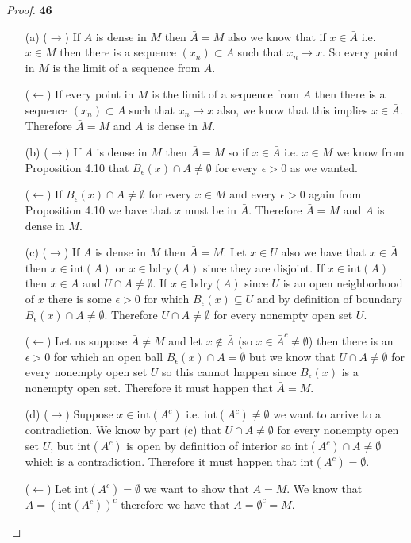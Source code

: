 \documentclass[11pt]{article}
\newcommand{\bdry}{\text{bdry}}
\newcommand{\inter}{\text{int}}
\theoremstyle{definition}
\begin{document}
\cleardoublepage
    \begin{proof}{\textbf{46}}
    \begin{itemize}
    \item [(a)] ($\rightarrow$)
    If $A$ is dense in $M$ then $\bar{A} = M$ also we know that if $x \in \bar{A}$
    i.e. $x \in M$ then there is a sequence $(x_n) \subset A$ such that
    $x_n \to x$. So every point in $M$ is the limit of a sequence from $A$.
    
    ($\leftarrow$) If every point in $M$ is the limit of a sequence from $A$
    then there is a sequence $(x_n) \subset A$ such that $x_n \to x$ also, we
    know that this implies $x \in \bar{A}$. Therefore $\bar{A} = M$ and $A$ is
    dense in $M$.

    \item [(b)] ($\rightarrow$) If $A$ is dense in $M$ then $\bar{A} = M$ so
    if $x \in \bar{A}$ i.e. $x \in M$ we know from Proposition 4.10 that
    $B_{\epsilon}(x) \cap A \neq \emptyset$ for every $\epsilon > 0$ as we
    wanted.

    ($\leftarrow$) If $B_{\epsilon}(x) \cap A \neq \emptyset$ for every $x \in M$
    and every $\epsilon > 0$ again from Proposition 4.10 we have that $x$ must
    be in $\bar{A}$. Therefore $\bar{A} = M$ and $A$ is dense in $M$.

    \item [(c)] ($\rightarrow$) If $A$ is dense in $M$ then $\bar{A} = M$. Let
    $x \in U$ also we have that  $x \in \bar{A}$ then $x \in \inter(A)$ or
    $x \in \bdry(A)$ since they are disjoint. If $x \in \inter(A)$ then $x \in A$
    and $U \cap A \neq \emptyset$.
    If $x \in \bdry(A)$ since $U$ is an open neighborhood of $x$ there is some
    $\epsilon > 0$ for which $B_{\epsilon}(x) \subseteq U$ and by definition
    of boundary $B_{\epsilon}(x) \cap A \neq \emptyset$. Therefore
    $U \cap A \neq \emptyset$ for every nonempty open set $U$.

    ($\leftarrow$) Let us suppose $\bar{A} \neq M$ and let $x \not\in \bar{A}$
    (so $x \in \bar{A}^c \neq \emptyset$)
    then there is an $\epsilon >0$ for which an open ball 
    $B_{\epsilon}(x) \cap  A = \emptyset$ but
    we know that $U \cap A \neq \emptyset$ for every nonempty open set $U$
    so this cannot happen since
    $B_{\epsilon}(x)$ is a nonempty open set. Therefore it must happen that
    $\bar{A} = M$.

    \item [(d)] ($\rightarrow$) Suppose $x \in \inter(A^c)$ i.e.
    $\inter(A^c) \neq \emptyset$ we want to arrive to a contradiction. We
    know by part (c) that $U \cap A \neq \emptyset$ for every nonempty open set
    $U$, but $\inter(A^c)$ is open by definition of interior so
    $\inter(A^c) \cap A \neq \emptyset$ which is a contradiction. Therefore it
    must happen that $\inter(A^c) = \emptyset$.

    ($\leftarrow$) Let $\inter(A^c) = \emptyset$ we want to show that
    $\bar{A} = M$. We know that $\bar{A} = (\inter(A^c))^c$ therefore we have
    that $\bar{A} = \emptyset^c = M$. 
    \end{itemize}        
    \end{proof}
\end{document}
